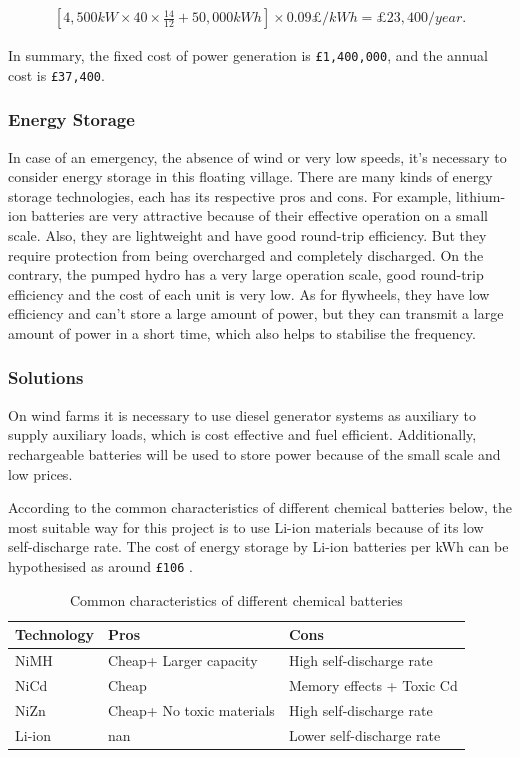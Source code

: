 \documentclass[11pt]{article}
\numberwithin{equation}{section}
\begin{document}
\begin{align}
\label{eqEnergyCost}
\left[4,500kW\times 40\times \frac{14}{12}+ 50,000kWh\right]\times 0.09 \pounds /kWh = \pounds23,400/year.
\end{align}

In summary, the fixed cost of power generation  is \texttt{£1,400,000}, and the annual cost is \texttt{£37,400}.

\subsubsection{Energy Storage}
\label{sec:org077a248}
In case of an emergency, the absence of wind or very low speeds, it’s necessary to consider energy storage in this floating village. There are many kinds of energy storage technologies, each has its respective pros and cons. For example, lithium-ion batteries are very attractive because of their effective operation on a small scale. Also, they are lightweight and have good round-trip efficiency. But they require protection from being overcharged and completely discharged. On the contrary, the pumped hydro has a very large operation scale, good round-trip efficiency and the cost of each unit is very low. As for flywheels, they have low efficiency and can’t store a large amount of power, but they can transmit a large amount of power in a short time, which also helps to stabilise the frequency.

\subsubsection{Solutions}
\label{sec:org6f97276}
On wind farms it is necessary to use diesel generator systems as auxiliary to supply auxiliary loads, which is cost effective and fuel efficient. Additionally, rechargeable batteries will be used to store power because of the small scale and low prices.

According to the common characteristics of different chemical batteries below, the most suitable way for this project is to use Li-ion materials because of its low self-discharge rate. The cost of energy storage by Li-ion batteries per kWh can be hypothesised as around \texttt{£106} \cite{123}.

\begin{table}[H]
\caption{\label{CharacteristicsOfBatteries}Common characteristics of different chemical batteries}
\centering
\begin{tabular}{lll}
\toprule
Technology & Pros\xa0 & Cons\\
\midrule
NiMH & Cheap+ Larger capacity & High self-discharge rate\\
NiCd & Cheap & Memory effects + Toxic Cd  \footnotemark\\
NiZn & Cheap+ No toxic materials & High self-discharge rate\\
Li-ion & nan & Lower self-discharge rate\\
\bottomrule
\end{tabular}
\end{table}
\end{document}
